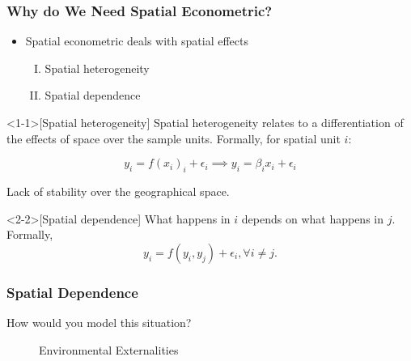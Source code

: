 \documentclass[english,10pt]{beamer}\usepackage[]{graphicx}\usepackage[]{xcolor}
\begin{document}
\begin{frame}
  \frametitle{Why do We Need Spatial Econometric?}
    \begin{itemize}
      \item Spatial econometric deals with \alert{spatial effects}
        \begin{enumerate}[(I)]
          \item<1-1> Spatial heterogeneity
          \item<2-2> Spatial dependence
        \end{enumerate}
    \end{itemize}
    
    \begin{definition}<1-1>[Spatial heterogeneity]
        Spatial heterogeneity relates to a \alert{differentiation} of the effects of space over the sample units. Formally, for spatial unit $i$:
        
        \begin{equation*}
          y_i = f(x_i)_i + \epsilon_i \implies y_i = \beta_i x_i + \epsilon_i
        \end{equation*}
        
    Lack of stability over the geographical space.
    \end{definition}

    \begin{definition}<2-2>[Spatial dependence]
       What happens in $i$ depends on what happens in $j$. Formally,
        \begin{equation*}
          y_i = f(y_i, y_j) + \epsilon_i, \forall i \neq j.
        \end{equation*}
    \end{definition}
\end{frame}


\begin{frame}
  \frametitle{Spatial Dependence}
    \begin{alertblock}{}
  How would you model this situation?
  \end{alertblock}
  
  \begin{figure}[h]
\caption{Environmental Externalities}
\label{fig:example_poll}
\centering
{}
\end{figure}
\end{frame}
\end{document}
